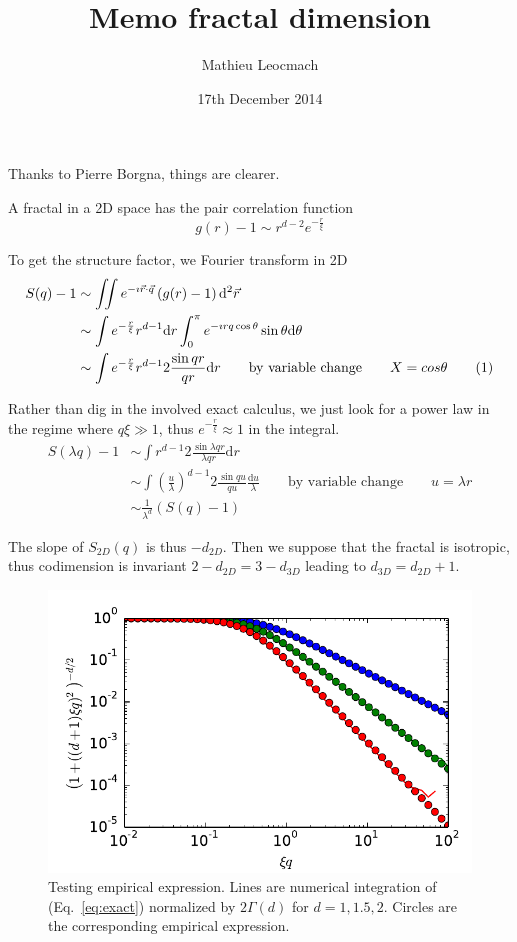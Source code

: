 \documentclass[12pt,a4paper]{article}
\author{Mathieu Leocmach}
\title{Memo fractal dimension}
\date{17th December 2014}
\begin{document}
\maketitle

Thanks to Pierre Borgna, things are clearer.

A fractal in a 2D space has the pair correlation function
\begin{equation}
g(r) -1 \sim r^{d-2} e^{-\frac{r}{\xi}}
\end{equation}

To get the structure factor, we Fourier transform in 2D
\begin{align*}
S(q) -1 &\sim \iint e^{-\imath \vec{r}\cdot\vec{q}} \left(g(r)-1\right) \mathrm{d}^2\vec{r}\\
&\sim \int e^{-\frac{r}{\xi}} r^{d-1} \mathrm{d}r
	\int_0^\pi e^{-\imath rq \cos \theta} \sin\theta \mathrm{d}\theta\\
&\sim \int e^{-\frac{r}{\xi}} r^{d-1} 2\frac{\sin qr}{qr}\mathrm{d}r
\qquad\text{by variable change}\qquad X=cos\theta
\addtocounter{equation}{1}\tag{\theequation}\label{eq:exact}\\
\end{align*}

Rather than dig in the involved exact calculus, we just look for a power law in the regime where $q\xi \gg 1$, thus $e^{-\frac{r}{\xi}} \approx 1$ in the integral.
\begin{align*}
S(\lambda q) -1 &\sim \int r^{d-1} 2\frac{\sin \lambda qr}{\lambda qr}\mathrm{d}r\\
&\sim \int \left(\frac{u}{\lambda}\right)^{d-1} 2\frac{\sin qu}{qu}\frac{\mathrm{d}u}{\lambda} \qquad\text{by variable change}\qquad u=\lambda r\\
&\sim \frac{1}{\lambda^d} \left(S(q) -1\right)
\end{align*}

The slope of $S_{2D}(q)$ is thus $-d_{2D}$. Then we suppose that the fractal is isotropic, thus codimension is invariant $2-d_{2D} = 3-d_{3D}$ leading to $d_{3D} = d_{2D}+1$.

\begin{figure}
\includegraphics{empirical_fractal}
\caption{Testing empirical expression. Lines are numerical integration of (Eq.~\ref{eq:exact}) normalized by $2\Gamma(d)$ for $d=1,1.5,2$. Circles are the corresponding empirical expression.}
\label{fig:empirical}
\end{figure}
\end{document}

